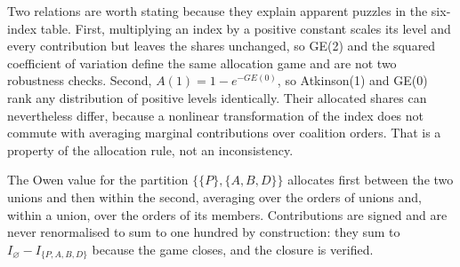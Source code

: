 Two relations are worth stating because they explain apparent puzzles in the six-index table. First, multiplying an index by a positive constant scales its level and every contribution but leaves the shares unchanged, so GE(2) and the squared coefficient of variation define the same allocation game and are not two robustness checks. Second, \(A(1)=1-e^{-GE(0)}\), so Atkinson(1) and GE(0) rank any distribution of positive levels identically. Their allocated shares can nevertheless differ, because a nonlinear transformation of the index does not commute with averaging marginal contributions over coalition orders. That is a property of the allocation rule, not an inconsistency.

The Owen value for the partition \(\{\{P\},\{A,B,D\}\}\) allocates first between the two unions and then within the second, averaging over the orders of unions and, within a union, over the orders of its members. Contributions are signed and are never renormalised to sum to one hundred by construction: they sum to \(I_\varnothing-I_{\{P,A,B,D\}}\) because the game closes, and the closure is verified.

